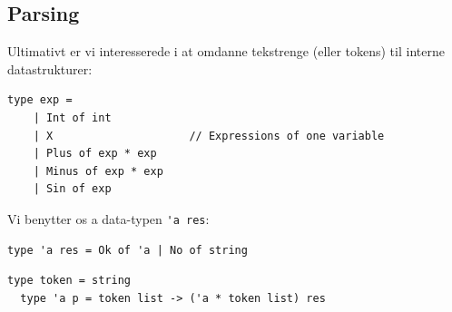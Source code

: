 \documentclass[rgb]{beamer}
\begin{document}
\subsection{Parsing}

\begin{frame}[fragile]
\begin{footnotesize}


  Ultimativt er vi interesserede i at omdanne tekstrenge (eller tokens) til interne datastrukturer:

  \vspace{1ex}

\begin{lstlisting}[numbers=none,frame=none,mathescape]
  type exp =
    | Int of int
    | X                     // Expressions of one variable
    | Plus of exp * exp
    | Minus of exp * exp
    | Sin of exp
\end{lstlisting}


Vi benytter os a data-typen \lstinline{'a res}:
\vspace{1ex}

\begin{lstlisting}[numbers=none,frame=none,mathescape]
  type 'a res = Ok of 'a | No of string
\end{lstlisting}


\begin{lstlisting}[numbers=none,frame=none,mathescape]
  type token = string
  type 'a p = token list -> ('a * token list) res
\end{lstlisting}

\end{footnotesize}
\end{frame}

\end{document}

